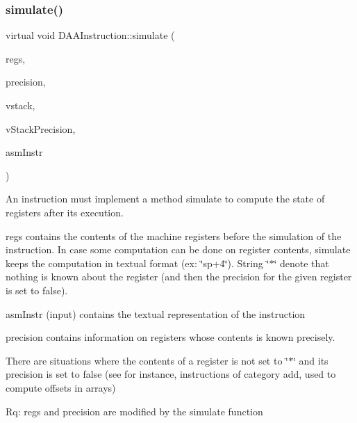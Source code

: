 \subsubsection{\texorpdfstring{simulate()}{simulate()}}
{\footnotesize\ttfamily virtual void D\+A\+A\+Instruction\+::simulate (\begin{DoxyParamCaption}\item[{\hyperlink{DAAInstruction_8h_af0fae93a861de9cf37988d5673cac523}{reg\+Table} \&}]{regs,  }\item[{\hyperlink{DAAInstruction_8h_a0e8cae02815a5f8adc750122d790b455}{reg\+Precision\+Table} \&}]{precision,  }\item[{\hyperlink{DAAInstruction_8h_a1b0e70ac1a04f06c8132055ed01f589f}{stack\+Type} \&}]{vstack,  }\item[{\hyperlink{DAAInstruction_8h_ac5cb793e9dac3fa9693da78b7e29ab30}{stack\+Prec\+Type} \&}]{v\+Stack\+Precision,  }\item[{const string \&}]{asm\+Instr }\end{DoxyParamCaption})\hspace{0.3cm}{\ttfamily [pure virtual]}}

An instruction must implement a method simulate to compute the state of registers after its execution.

regs contains the contents of the machine registers before the simulation of the instruction. In case some computation can be done on register contents, simulate keeps the computation in textual format (ex\+: \char`\"{}sp+4\char`\"{}). String \char`\"{}$\ast$\char`\"{} denote that nothing is known about the register (and then the precision for the given register is set to false).

asm\+Instr (input) contains the textual representation of the instruction

precision contains information on registers whose contents is known precisely.

There are situations where the contents of a register is not set to \char`\"{}$\ast$\char`\"{} and its precision is set to false (see for instance, instructions of category add, used to compute offsets in arrays)

Rq\+: regs and precision are modified by the simulate function 


